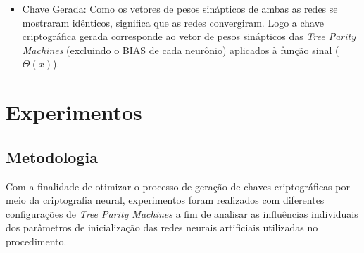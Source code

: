 \documentclass[a4paper,10pt,oneside,conference,final,keeplastbox]{inatel}
\begin{document}
        \begin{itemize}
            \item Chave Gerada:
            Como os vetores de pesos sinápticos de ambas as redes se mostraram idênticos, significa que as redes convergiram. Logo a chave criptográfica gerada corresponde ao vetor de pesos sinápticos das \textit{Tree Parity Machines} (excluindo o BIAS de cada neurônio) aplicados à função sinal (\textit{$\Theta(x)$}).
        \end{itemize}
        
    \section{Experimentos}
    \label{sec:experimentos}
  
        \subsection{Metodologia}
        \label{subsec:metodologia}
            
            Com a finalidade de otimizar o processo de geração de chaves criptográficas por meio da criptografia neural, experimentos foram realizados com diferentes configurações de \textit{Tree Parity Machines} a fim de analisar as influências individuais dos parâmetros de inicialização das redes neurais artificiais utilizadas no procedimento.
            
\end{document}

